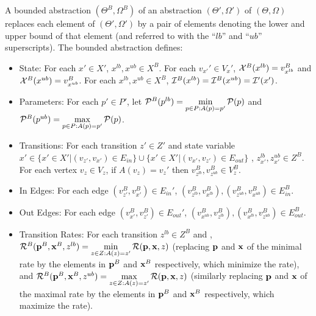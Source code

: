 \begin{definition}
A bounded abstraction $(\Theta^B, \Omega^B)$ of an abstraction $(\Theta',
\Omega')$ of $(\Theta, \Omega)$ replaces each element of $(\Theta', \Omega')$ by
a pair of elements denoting the lower and upper bound of that element (and
referred to with the ``$lb$'' and ``$ub$'' superscripts).  The bounded
abstraction defines:
\begin{itemize}
    \item State: For each $x' \in X'$,  $x^{lb}, x^{ub} \in X^B$.  For each
    $v_{x'}' \in V_x'$, ${\cal X}^B(x^{lb}) = v_{x^{lb}}^B$ and ${\cal
    X}^B(x^{ub}) = v_{x^{ub}}^B$.   For each $x^{lb}, x^{ub} \in X^B$, ${\cal
    I}^B(x^{lb}) = {\cal I}^B(x^{ub}) = {\cal I}'(x')$.
        \item Parameters: For each $p' \in P'$, let ${\cal P}^B(p^{lb}) =
        \min\limits_{p \in P: A(p) = p'} {\cal P}(p)$ and ${\cal P}^B(p^{ub}) =
        \max\limits_{p \in P: A(p) = p'} {\cal P}(p)$. 
        

        \item Transitions: For each transition $z' \in Z'$ and state variable $x'\in \{x'\in X' | (v_{z'}, v_{x'}) \in E_{in}\} \cup \{x'\in X' | ( v_{x'}, v_{z'}) \in E_{out}\}$ , $z^{lb}_{x'}, z^{ub}_{x'} \in Z^B$. For
        each vertex $v_z \in V_z$, if $A(v_z)=v_z'$ then $v_{z^{lb}}^B, v_{z^{ub}}^B \in V_z^B$.
        
        \item In Edges: For each edge $(v_{z'}^B, v_{x'}^B) \in E_{in}'$,
        $(v_{z^{lb}}^B, v_{x^{lb}}^B), (v_{z^{ub}}^B, v_{x^{ub}}^B) \in E^B_{in}$.
        \item Out Edges: For each edge $(v_{x'}^B, v_{z'}^B) \in E_{out}'$,
        $(v_{x^{ub}}^B, v_{z^{lb}}^B), (v_{x^{lb}}^B, v_{z^{ub}}^B) \in E^B_{out}$.

        
        \item Transition Rates: For each transition $z^{lb} \in Z^B$ and , ${\cal R}^B({\bf
        p}^B, {\bf x}^B, z^{lb}) = \min\limits_{z \in Z: A(z)=z'} {\cal R}({\bf
        p}, {\bf x}, z)$ (replacing ${\bf p}$ and ${\bf x}$ of the minimal rate
        by the elements in ${\bf p}^B$ and ${\bf x}^B$ respectively, which
        minimize the rate), and ${\cal R}^B({\bf p}^B, {\bf x}^B, z^{ub}) =
        \max\limits_{z \in Z: A(z)=z'} {\cal R}({\bf p}, {\bf x}, z)$ (similarly
        replacing ${\bf p}$ and ${\bf x}$ of the maximal rate by the elements in
        ${\bf p}^B$ and ${\bf x}^B$ respectively, which maximize the rate).
\end{itemize}
    
\end{definition}

